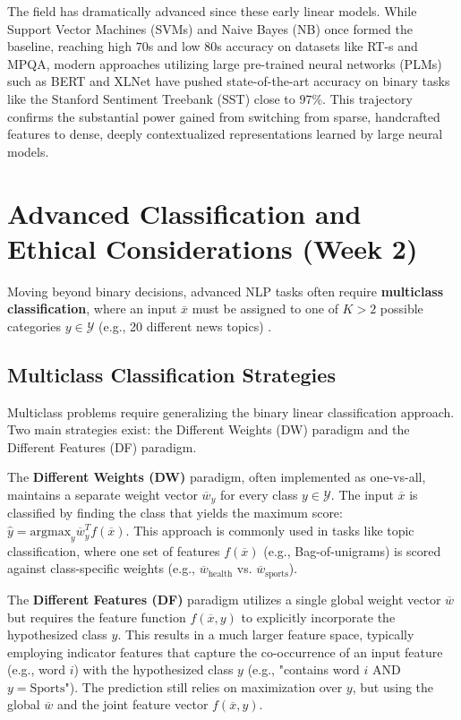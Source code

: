 \documentclass{article}
\begin{document}
The field has dramatically advanced since these early linear models. While Support Vector Machines (SVMs) and Naive Bayes (NB) once formed the baseline, reaching high $70$s and low $80$s accuracy on datasets like RT-s and MPQA, modern approaches utilizing large pre-trained neural networks (PLMs) such as BERT and XLNet have pushed state-of-the-art accuracy on binary tasks like the Stanford Sentiment Treebank (SST) close to $97\%$. This trajectory confirms the substantial power gained from switching from sparse, handcrafted features to dense, deeply contextualized representations learned by large neural models.

\section{Advanced Classification and Ethical Considerations (Week 2)}

Moving beyond binary decisions, advanced NLP tasks often require \textbf{multiclass classification}, where an input $\overline{x}$ must be assigned to one of $K > 2$ possible categories $y \in \mathcal{Y}$ (e.g., 20 different news topics) .

\subsection{Multiclass Classification Strategies}

Multiclass problems require generalizing the binary linear classification approach. Two main strategies exist: the Different Weights (DW) paradigm and the Different Features (DF) paradigm.

The \textbf{Different Weights (DW)} paradigm, often implemented as one-vs-all, maintains a separate weight vector $\overline{w}_y$ for every class $y \in \mathcal{Y}$. The input $\overline{x}$ is classified by finding the class that yields the maximum score: $\hat{y} = \text{argmax}_{y} \overline{w}_{y}^{T}f(\overline{x})$. This approach is commonly used in tasks like topic classification, where one set of features $f(\overline{x})$ (e.g., Bag-of-unigrams) is scored against class-specific weights (e.g., $\overline{w}_{\text{health}}$ vs. $\overline{w}_{\text{sports}}$).

The \textbf{Different Features (DF)} paradigm utilizes a single global weight vector $\overline{w}$ but requires the feature function $f(\overline{x}, y)$ to explicitly incorporate the hypothesized class $y$. This results in a much larger feature space, typically employing indicator features that capture the co-occurrence of an input feature (e.g., word $i$) with the hypothesized class $y$ (e.g., "contains word $i$ AND $y=\text{Sports}$"). The prediction still relies on maximization over $y$, but using the global $\overline{w}$ and the joint feature vector $f(\overline{x}, y)$.
\end{document}
